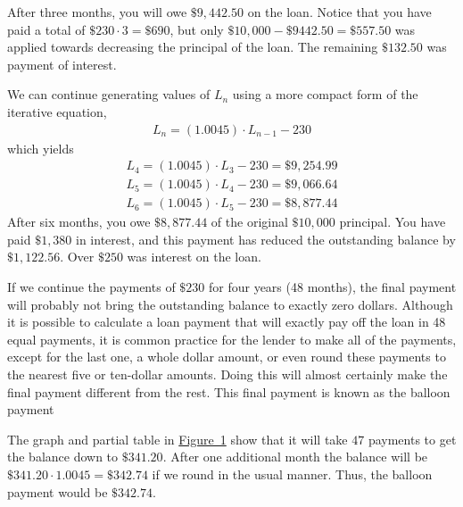 \documentclass[10pt,]{book}
\theoremstyle{ptxdefinitionnotitle}
\theoremstyle{ptxdefinitiontitle}
\theoremstyle{ptxdefinitionnotitle}
\theoremstyle{ptxdefinitiontitle}
\theoremstyle{ptxdefinitionnotitle}
\theoremstyle{ptxdefinitiontitle}
\numberwithin{equation}{section}
\begin{document}
\hypertarget{p-35}{}%
After three months, you will owe \(\$9,442.50\) on the loan. Notice that you have paid a total of \(\$230\cdot 3=\$690\), but only \(\$10,000-\$9442.50=\$557.50\) was applied towards decreasing the principal of the loan. The remaining \(\$132.50\) was payment of interest.%
\par
\hypertarget{p-36}{}%
We can continue generating values of \(L_n\) using a more compact form of the iterative equation,%
%
\begin{gather*}
L_n=(1.0045)\cdot L_{n-1}-230
\end{gather*}
\hypertarget{p-37}{}%
which yields%
%
\begin{gather*}
L_4=(1.0045)\cdot L_3-230=\$9,254.99\\
L_5=(1.0045)\cdot L_4-230=\$9,066.64\\
L_6=(1.0045)\cdot L_5-230=\$8,877.44
\end{gather*}
\hypertarget{p-38}{}%
After six months, you owe \(\$8,877.44\) of the original \(\$10,000\) principal.  You have paid \(\$1,380\) in interest, and this payment has reduced the outstanding balance by \(\$1,122.56\).  Over \(\$250\) was interest on the loan.%
\par
\hypertarget{p-39}{}%
If we continue the payments of \(\$230\) for four years (48 months), the final payment will probably not bring the outstanding balance to exactly zero dollars.  Although it is possible to calculate a loan payment that will exactly pay off the loan in 48 equal payments, it is common practice for the lender to make all of the payments, except for the last one, a whole dollar amount, or even round these payments to the nearest five or ten-dollar amounts. Doing this will almost certainly make the final payment different from the rest.  This final payment is known as the balloon payment%
\par
\hypertarget{p-40}{}%
The graph and partial table in \hyperref[loan-balance]{Figure~1} show that it will take \(47\) payments to get the balance down to \(\$341.20\).  After one additional month the balance will be \(\$341.20\cdot 1.0045=\$342.74\) if we round in the usual manner.  Thus, the balloon payment would be \(\$342.74\).%
\end{document}
